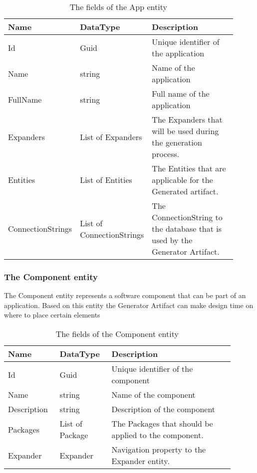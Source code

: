 \begin{table}[H]
    \small
    \begin{tabular}{ p{0.21\linewidth} p{0.21\linewidth} p{0.49\linewidth} }
        \hline
        \textbf{Name} & \textbf{DataType} & \textbf{Description} \\
        \hline
        Id & Guid & Unique identifier of the application \\
        Name & string & Name of the application \\
        FullName & string & Full name of the application \\
        Expanders & List of Expanders & The Expanders that will be used during the
        generation process. \\
        Entities & List of Entities & The Entities that are applicable for the Generated artifact. \\
        ConnectionStrings & List of ConnectionStrings & The ConnectionString to the
        database that is used by the Generator Artifact. \\
        \hline
    \end{tabular}
    \caption{The fields of the App entity}
    \label{table:app_entity}
\end{table}

\subsubsection{The Component entity}

The Component entity represents a software component that can be part of an application.
Based on this entity the Generator Artifact can make design time on where to place certain
elements  

\begin{table}[H]
\small
\begin{tabular}{ p{0.20\linewidth} p{0.20\linewidth} p{0.50\linewidth} }
\hline
\textbf{Name} & \textbf{DataType} & \textbf{Description} \\
\hline
Id & Guid & Unique identifier of the component \\
Name & string & Name of the component \\
Description & string & Description of the component \\
Packages & List of Package & The Packages that should be applied to the component. \\
Expander & Expander & Navigation property to the Expander entity. \\
\hline
\end{tabular}
\caption{The fields of the Component entity}
\label{table:component_entity}
\end{table}

